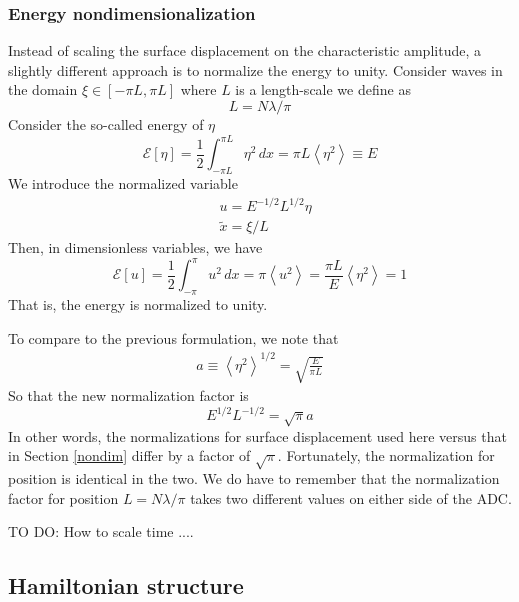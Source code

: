 \documentclass[11pt]{article}
\newcommand{\mean}[1]{\left< #1 \right>}
\newcommand{\amp}{a}
\newcommand{\lam}{\lambda}
\newcommand{\lamfac}{N}
\newcommand{\En}{\mathcal{E}}
\newcommand{\dx}{\, dx}
\begin{document}
\subsubsection{Energy nondimensionalization}

Instead of scaling the surface displacement on the characteristic amplitude, a slightly different approach is to normalize the energy to unity. Consider waves in the domain $\xi \in [-\pi L, \pi L]$ where $L$ is a length-scale we define as
\begin{equation}
L = \lamfac \lam / \pi
\end{equation}
Consider the so-called energy of $\eta$
\begin{equation}
\En [\eta] = \frac{1}{2} \int_{-\pi L}^{\pi L} \eta^2 \dx = \pi L \mean{\eta^2} \equiv E
\end{equation}
We introduce the normalized variable
\begin{align}
&u = E^{-1/2}L^{1/2} \eta \\
&\tilde{x} = \xi/L
\end{align}
Then, in dimensionless variables, we have
\begin{equation}
\En [u] = \frac{1}{2} \int_{-\pi}^{\pi} u^2 \dx = \pi \mean{u^2} = \frac{\pi L}{E} \mean{\eta^2} = 1
\end{equation}
That is, the energy is normalized to unity.

To compare to the previous formulation, we note that
\begin{align}
\amp \equiv \mean{\eta^2}^{1/2} = \sqrt{ \frac{E}{\pi L} }
\end{align}
So that the new normalization factor is
\begin{equation}
E^{1/2}L^{-1/2} = \sqrt{\pi} \amp
\end{equation}
In other words, the normalizations for surface displacement used here versus that in Section \ref{nondim}
 differ by a factor of $\sqrt{\pi}$. Fortunately, the normalization for position is identical in the two. We do have to remember that the normalization factor for position $L = \lamfac \lam / \pi$ takes two different values on either side of the ADC.

TO DO: How to scale time ....

\subsection{Hamiltonian structure}
\end{document}
